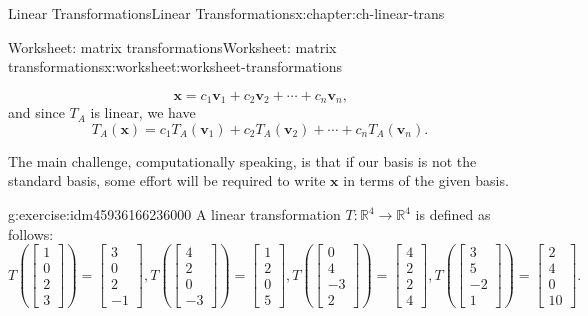 \documentclass[oneside,10pt,]{book}
\numberwithin{equation}{section}
\newcommand{\R}{\mathbb{R}}
\newcommand{\vv}{\mathbf{v}}
\newcommand{\xx}{\mathbf{x}}
\begin{document}
\begin{chapterptx}{Linear Transformations}{}{Linear Transformations}{}{}{x:chapter:ch-linear-trans}
\begin{worksheet-section}{Worksheet: matrix transformations}{}{Worksheet: matrix transformations}{}{}{x:worksheet:worksheet-transformations}
\begin{introduction}{}
\begin{equation*}
\xx = c_1\vv_1+c_2\vv_2+\cdots + c_n\vv_n\text{,}
\end{equation*}
and since \(T_A\) is linear, we have%
\begin{equation*}
T_A(\xx)=c_1T_A(\vv_1)+c_2T_A(\vv_2)+\cdots +c_nT_A(\vv_n)\text{.}
\end{equation*}
%
\par
The main challenge, computationally speaking, is that if our basis is not the standard basis, some effort will be required to write \(\xx\) in terms of the given basis.%
\end{introduction}%
\begin{divisionexercise}{1}{}{}{g:exercise:idm45936166236000}%
A linear transformation \(T:\R^4\to \R^4\) is defined as follows:%
\begin{equation*}
T\left(\begin{bmatrix}1\\0\\2\\3\end{bmatrix}\right)=\begin{bmatrix}3\\0\\2\\-1\end{bmatrix},
T\left(\begin{bmatrix}4\\2\\0\\-3\end{bmatrix}\right)=\begin{bmatrix}1\\2\\0\\5\end{bmatrix},
T\left(\begin{bmatrix}0\\4\\-3\\2\end{bmatrix}\right)=\begin{bmatrix}4\\2\\2\\4\end{bmatrix},
T\left(\begin{bmatrix}3\\5\\-2\\1\end{bmatrix}\right)=\begin{bmatrix}2\\4\\0\\10\end{bmatrix}\text{.}

\end{equation*}
\end{divisionexercise}
\end{worksheet-section}
\end{chapterptx}
\end{document}
